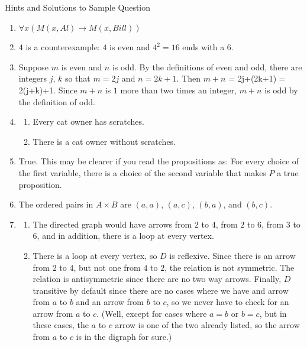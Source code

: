 \documentclass[11pt]{amsart}
\begin{document}
\begin{center}Hints and Solutions to Sample Question\end{center}
\begin{enumerate}

\medskip

\item $\forall{x}(M(x,Al)\longrightarrow M(x,Bill))$

\medskip

\item $4$ is a counterexample: $4$ is even and $4^2 = 16$ ends with a $6$.

\medskip

\item Suppose $m$ is even and $n$ is odd. By the definitions of even and odd, there are integers $j$, $k$ so that $m= 2j$ and $n = 2k+1$.  Then $m+n$ = 2j+(2k+1) = 2(j+k)+1. Since $m+n$ is $1$ more than
two times an integer, $m+n$ is odd by the definition of odd.

\medskip


\item 

\begin{enumerate}
\item Every cat owner has scratches.

\item There is a cat owner without scratches. 
\end{enumerate}

\medskip


\item True. This may be clearer if you read the propositions as: For every choice of the first variable, there is a choice of the second variable that makes $P$ a true proposition.

\medskip


\item The ordered pairs in $A\times B$ are $(a,a)$, $(a,c)$, $(b,a)$, and $(b,c)$.

\medskip


\item

\begin{enumerate}
\item The directed graph would have arrows from $2$ to $4$, from $2$ to $6$, from $3$ to $6$, and
in addition, there is a loop at every vertex.

\item There is a loop at every vertex, so $D$ is reflexive. Since there is an arrow from $2$ to $4$, but not one from $4$ to $2$, the relation is not symmetric. The relation is antisymmetric since there are no two way
arrows. Finally, $D$ transitive by default since there are no cases where we have and arrow from 
$a$ to $b$ and an arrow from $b$ to $c$, so we never have to check for an arrow from $a$ to $c$.
(Well, except for cases where  $a=b$ or $b=c$, but in these cases, the $a$ to $c$ arrow is one of the
two already listed, so the arrow from $a$ to $c$ is in the digraph for sure.)
\end{enumerate}
\medskip



\end{enumerate}
\end{document}
